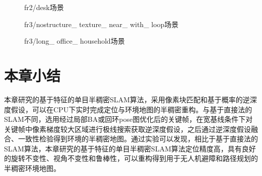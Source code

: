 \begin{figure}[h]
    \centering
     \caption{fr2/desk场景}
\label{fig4.4}
\end{figure}

\begin{figure}[H]
    \centering
     \caption{fr3/nostructure\_ texture\_ near\_ with\_ loop场景}
\label{fig4.5}
\end{figure}



\begin{figure}[h]
    \centering
     \caption{fr3/long\_ office\_ household场景}
\label{fig4.6}
\end{figure}


\section{本章小结}
本章研究的基于特征的单目半稠密SLAM算法，采用像素块匹配和基于概率的逆深度假设，可以在CPU下实时完成定位与环境地图的半稠密重构。与基于直接法的SLAM不同，选用经过局部BA或回环pose图优化后的关键帧，在宽基线条件下对关键帧中像素梯度较大区域进行极线搜索获取逆深度假设，之后通过逆深度假设融合、一致性检验得到环境的半稠密地图。通过实验可以发现，相比于基于直接法的SLAM算法，本章研究的基于特征的单目半稠密SLAM算法定位精度高，具有良好的旋转不变性、视角不变性和鲁棒性，可以重构得到用于无人机避障和路径规划的半稠密环境地图。




